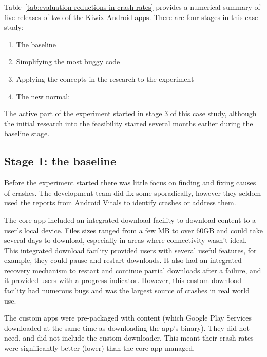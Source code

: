 Table~\ref{tab:evaluation-reductions-in-crash-rates} provides a numerical summary of five releases of two of the Kiwix Android apps. There are four stages in this case study:

\begin{enumerate}
    \itemsep0em
    \item The baseline
    \item Simplifying the most buggy code
    \item Applying the concepts in the research to the experiment
    \item The new normal: %
\end{enumerate}

The active part of the experiment started in stage 3 of this case study, although the initial research into the feasibility started several months earlier during the baseline stage.

\subsection{Stage 1: the baseline}
Before the experiment started there was little focus on finding and fixing causes of crashes. The development team did fix some sporadically, however they seldom used the reports from Android Vitals to identify crashes or address them.

The core app included an integrated download facility to download content to a user's local device. Files sizes ranged from a few MB to over 60GB and could take several days to download, especially in areas where connectivity wasn't ideal.  This integrated download facility provided users with several useful features, for example, they could pause and restart downloads. It also had an integrated recovery mechanism to restart and continue partial downloads after a failure, and it provided users with a progress indicator. However, this custom download facility had numerous bugs and was the largest source of crashes in real world use.

The custom apps were pre-packaged with content (which Google Play Services downloaded at the same time as downloading the app's binary). They did not need, and did not include the custom downloader. This meant their crash rates were significantly better (lower) than the core app managed.

